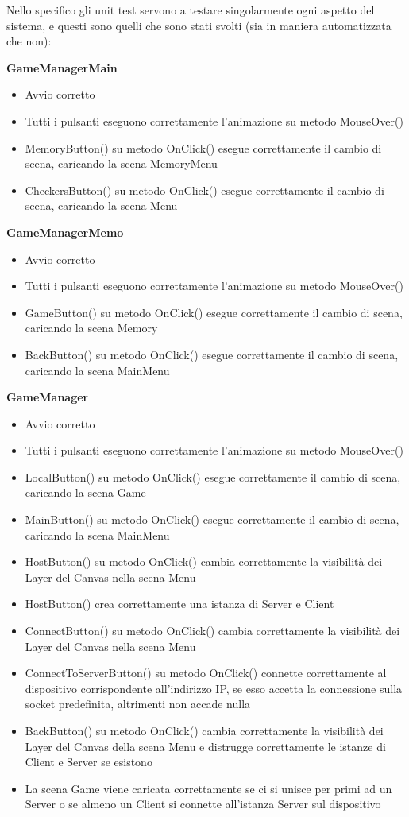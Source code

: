 \documentclass[12pt]{article}
\begin{document}
Nello specifico gli unit test servono a testare singolarmente ogni aspetto del sistema, e questi sono quelli che sono stati svolti (sia in maniera automatizzata che non):
\newline

\textbf{\Large GameManagerMain}
\begin{itemize}
\item Avvio corretto
\item Tutti i pulsanti eseguono correttamente l'animazione su metodo MouseOver()
\item MemoryButton() su metodo OnClick() esegue correttamente il cambio di scena, caricando la scena MemoryMenu
\item CheckersButton() su metodo OnClick() esegue correttamente il cambio di scena, caricando la scena Menu
\end{itemize}

\textbf{\Large GameManagerMemo}
\begin{itemize}
\item Avvio corretto
\item Tutti i pulsanti eseguono correttamente l'animazione su metodo MouseOver()
\item GameButton() su metodo OnClick() esegue correttamente il cambio di scena, caricando la scena Memory
\item BackButton() su metodo OnClick() esegue correttamente il cambio di scena, caricando la scena MainMenu
\end{itemize}

\textbf{\Large GameManager}
\begin{itemize}
\item Avvio corretto
\item Tutti i pulsanti eseguono correttamente l'animazione su metodo MouseOver()
\item LocalButton() su metodo OnClick() esegue correttamente il cambio di scena, caricando la scena Game
\item MainButton() su metodo OnClick() esegue correttamente il cambio di scena, caricando la scena MainMenu
\item HostButton() su metodo OnClick() cambia correttamente la visibilità dei Layer del Canvas nella scena Menu
\item HostButton() crea correttamente una istanza di Server e Client
\item ConnectButton() su metodo OnClick() cambia correttamente la visibilità dei Layer del Canvas nella scena Menu
\item ConnectToServerButton() su metodo OnClick() connette correttamente al dispositivo corrispondente all'indirizzo IP, se esso accetta la connessione sulla socket predefinita, altrimenti non accade nulla
\item BackButton() su metodo OnClick() cambia correttamente la visibilità dei Layer del Canvas della scena Menu e distrugge correttamente le istanze di Client e Server se esistono
\item La scena Game viene caricata correttamente se ci si unisce per primi ad un Server o se almeno un Client si connette all'istanza Server sul dispositivo
\end{itemize}
\end{document}

